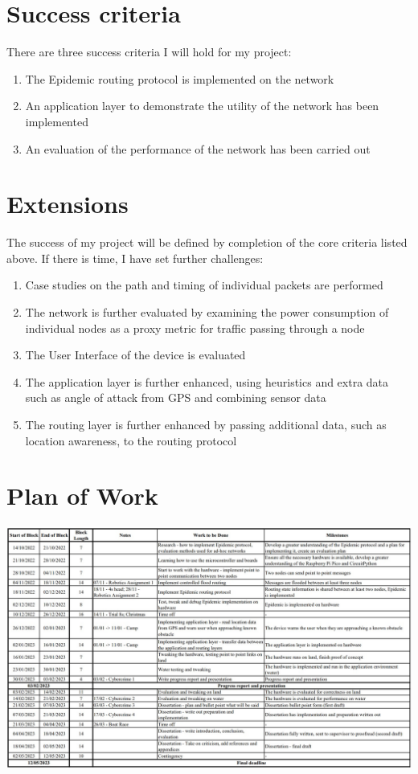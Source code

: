 \documentclass[10pt, a4paper]{article}
\begin{document}
\section*{Success criteria}
There are three success criteria I will hold for my project:
\begin{enumerate}
\item The Epidemic routing protocol is implemented on the network 
\item An application layer to demonstrate the utility of the network has been implemented
\item An evaluation of the performance of the network has been carried out
\end{enumerate}

\section*{Extensions}
The success of my project will be defined by completion of the core criteria listed above. If there is time, I have set further challenges:
\begin{enumerate}
\item Case studies on the path and timing of individual packets are performed
\item The network is further evaluated by examining the power consumption of individual nodes as a proxy metric for traffic passing through a node
\item The User Interface of the device is evaluated
\item The application layer is further enhanced, using heuristics and extra data such as angle of attack from GPS and combining sensor data
\item The routing layer is further enhanced by passing additional data, such as location awareness, to the routing protocol
\end{enumerate}

\section*{Plan of Work}
\includegraphics[width=\textwidth]{Plan.jpg}
\end{document}

